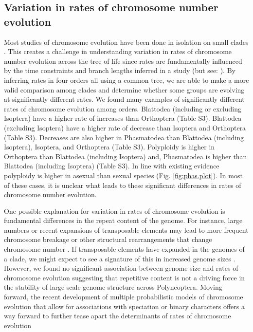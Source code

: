 \documentclass[]{rsos}%
\begin{document}
\subsection{Variation in rates of chromosome number evolution}
Most studies of chromosome evolution have been done in isolation on small clades \cite{rockman2002, mccann2016, deoliveira}. 
This creates a challenge in understanding variation in rates of chromosome number evolution across the tree of life since rates are fundamentally influenced by the time constraints and branch lengths inferred in a study (but see: \cite{blackmon2019meiotic, zenil2017}).
By inferring rates in four orders all using a common tree, we are able to make a more valid comparison among clades and determine whether some groups are evolving at significantly different rates.
We found many examples of significantly different rates of chromosome evolution among orders.
Blattodea (including or excluding Isoptera) have a higher rate of increases than Orthoptera (Table S3).
Blattodea (excluding Isoptera) have a higher rate of decrease than Isoptera and Orthoptera  (Table S3).
Decreases are also higher in Phasmatodea than Blattodea (including Isoptera), Isoptera, and Orthoptera  (Table S3).
Polyploidy is higher in Orthoptera than Blattodea (including Isoptera) and, Phasmatodea is higher than Blattodea (including Isoptera)  (Table S3).
In line with existing evidence \cite{lokki1980polyploidy, blackmon2016} polyploidy is higher in asexual than sexual species (Fig. \ref{fig:phas.plot}).
In most of these cases, it is unclear what leads to these significant differences in rates of chromosome number evolution.

One possible explanation for variation in rates of chromosome evolution is fundamental differences in the repeat content of the genome.
For instance, large numbers or recent expansions of transposable elements may lead to more frequent chromosome breakage or other structural rearrangements that change chromosome number \cite{carbone2014gibbon}.
If transposable elements have expanded in the genomes of a clade, we might expect to see a signature of this in increased genome sizes \cite{kidwell2002transposable}.
However, we found no significant association between genome size and rates of chromosome evolution suggesting that repetitive content is not a driving force in the stability of large scale genome structure across Polyneoptera.
Moving forward, the recent development of multiple probabilistic models of chromosome evolution that allow for associations with speciation or binary characters offers a way forward to further tease apart the determinants of rates of chromosome evolution \cite{freyman2018, zenil2018chromploid, blackmon2019meiotic}
\end{document}
